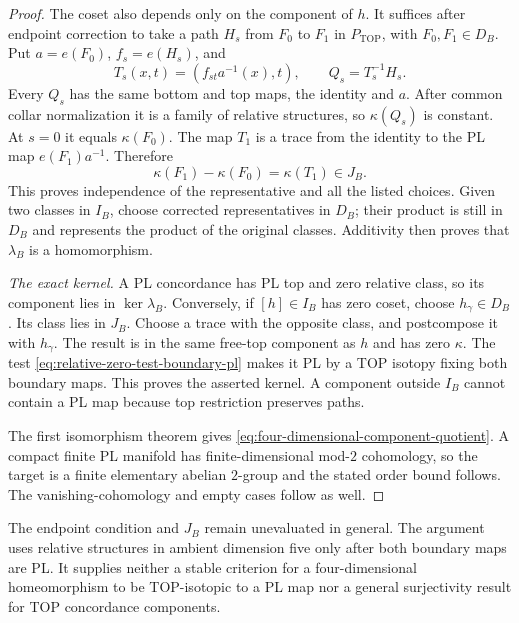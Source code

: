 \begin{proof}
The coset also depends only on the component of $h$.  It suffices
after endpoint correction to take a path $H_s$ from $F_0$ to $F_1$
in $P_{\mathrm{TOP}}$, with $F_0,F_1\in D_B$.  Put
$a=e(F_0)$, $f_s=e(H_s)$, and
\[
 T_s(x,t)=(f_{st}a^{-1}(x),t),\qquad Q_s=T_s^{-1}H_s.
\]
Every $Q_s$ has the same bottom and top maps, the identity and $a$.
After common collar normalization it is a family of relative
structures, so $\kappa(Q_s)$ is constant.  At $s=0$ it equals
$\kappa(F_0)$.  The map $T_1$ is a trace from the identity to
the PL map $e(F_1)a^{-1}$.  Therefore
\[
 \kappa(F_1)-\kappa(F_0)=\kappa(T_1)\in J_B.
\]
This proves independence of the representative and all the listed
choices.  Given two classes in $I_B$, choose corrected representatives
in $D_B$; their product is still in $D_B$ and represents the product
of the original classes.  Additivity then proves that $\lambda_B$
is a homomorphism.

\emph{The exact kernel.}
A PL concordance has PL top and zero relative class, so its component
lies in $\ker\lambda_B$.  Conversely, if $[h]\in I_B$ has zero
coset, choose $h_\gamma\in D_B$.  Its class lies in $J_B$.
Choose a trace with the opposite class, and postcompose it with
$h_\gamma$.  The result is in the same free-top component as $h$
and has zero $\kappa$.  The test
\eqref{eq:relative-zero-test-boundary-pl} makes it PL by a TOP
isotopy fixing both boundary maps.  This proves the asserted kernel.
A component outside $I_B$ cannot contain a PL map because top
restriction preserves paths.

The first isomorphism theorem gives
\eqref{eq:four-dimensional-component-quotient}.  A compact finite
PL manifold has finite-dimensional mod-$2$ cohomology, so the target
is a finite elementary abelian $2$-group and the stated order bound
follows.  The vanishing-cohomology and empty cases follow as well.
\end{proof}

The endpoint condition and $J_B$ remain unevaluated in general.
The argument uses relative structures in ambient dimension five
only after both boundary maps are PL.  It supplies neither a stable
criterion for a four-dimensional homeomorphism to be TOP-isotopic to a PL map
nor a general surjectivity result for TOP concordance components.
